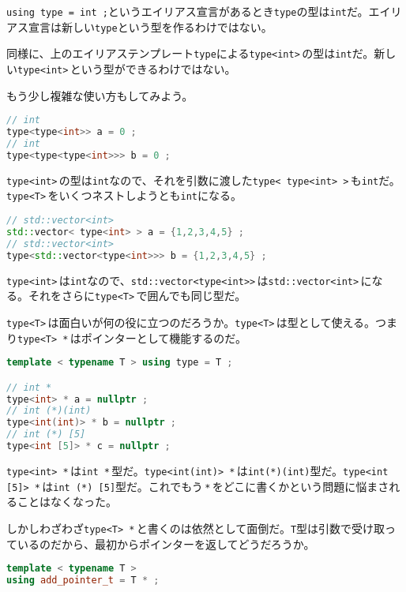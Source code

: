 \texttt{using type = int ;}というエイリアス宣言があるとき\texttt{type}の型は\texttt{int}だ。エイリアス宣言は新しい\texttt{type}という型を作るわけではない。

同様に、上のエイリアステンプレート\texttt{type}による\texttt{type<int>}\,の型は\texttt{int}だ。新しい\texttt{type<int>}\,という型ができるわけではない。

もう少し複雑な使い方もしてみよう。

\begin{lstlisting}[language={C++}]
// int
type<type<int>> a = 0 ;
// int
type<type<type<int>>> b = 0 ;
\end{lstlisting}

\texttt{type<int>}\,の型は\texttt{int}なので、それを引数に渡した\texttt{type< type<int> >}\,も\texttt{int}だ。\texttt{type<T>}\,をいくつネストしようとも\texttt{int}になる。

\begin{lstlisting}[language={C++}]
// std::vector<int>
std::vector< type<int> > a = {1,2,3,4,5} ;
// std::vector<int>
type<std::vector<type<int>>> b = {1,2,3,4,5} ;
\end{lstlisting}

\texttt{type<int>}\,は\texttt{int}なので、\texttt{std::vector<type<int{>}{>}}\,は\texttt{std::vector<int>}\,になる。それをさらに\texttt{type<T>}\,で囲んでも同じ型だ。

\texttt{type<T>}\,は面白いが何の役に立つのだろうか。\texttt{type<T>}\,は型として使える。つまり\texttt{type<T> *}\,はポインターとして機能するのだ。

\begin{lstlisting}[language={C++}]
template < typename T > using type = T ;

// int *
type<int> * a = nullptr ;
// int (*)(int)
type<int(int)> * b = nullptr ;
// int (*) [5]
type<int [5]> * c = nullptr ;
\end{lstlisting}

\texttt{type<int> *}\,は\texttt{int *}\,型だ。\texttt{type<int(int)> *}\,は\texttt{int(*)(int)}型だ。\texttt{type<int [5]> *}\,は\texttt{int (*) [5]}型だ。これでもう\,\texttt{*}\,をどこに書くかという問題に悩まされることはなくなった。

しかしわざわざ\texttt{type<T> *}\,と書くのは依然として面倒だ。\texttt{T}型は引数で受け取っているのだから、最初からポインターを返してどうだろうか。

\begin{lstlisting}[language={C++}]
template < typename T >
using add_pointer_t = T * ;
\end{lstlisting}


